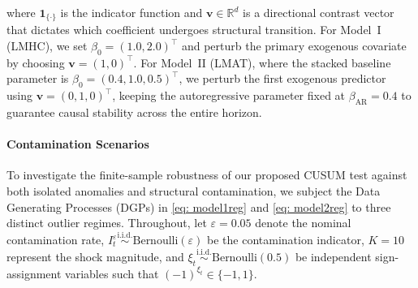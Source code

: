\documentclass[10pt, a4paper]{article}
\theoremstyle{assumption}
\theoremstyle{definition}
\theoremstyle{theorem}
\begin{document}
    where $\mathbf{1}_{\{\cdot\}}$ is the indicator function and $\mathbf{v} \in \mathbb{R}^d$ is a directional contrast vector that dictates which coefficient undergoes structural transition. For Model~I (LMHC), we set $\beta_0 = (1.0, 2.0)^\top$ and perturb the primary exogenous covariate by choosing $\mathbf{v} = (1, 0)^\top$. For Model~II (LMAT), where the stacked baseline parameter is $\beta_0 = (0.4, 1.0, 0.5)^\top$, we perturb the first exogenous predictor using $\mathbf{v} = (0, 1, 0)^\top$, keeping the autoregressive parameter fixed at $\beta_{\text{AR}} = 0.4$ to guarantee causal stability across the entire horizon.



\paragraph{Contamination Scenarios} 
To investigate the finite-sample robustness of our proposed CUSUM test against both isolated anomalies and structural contamination, we subject the Data Generating Processes (DGPs) in \eqref{eq: model1reg} and \eqref{eq: model2reg} to three distinct outlier regimes. Throughout, let $\varepsilon =0.05$ denote the nominal contamination rate, $I_t^\varepsilon \overset{\text{i.i.d.}}{\sim} \text{Bernoulli}(\varepsilon)$ be the contamination indicator, $K = 10$ represent the shock magnitude, and $\xi_t \overset{\text{i.i.d.}}{\sim} \text{Bernoulli}(0.5)$ be independent sign-assignment variables such that $(-1)^{\xi_t} \in \{-1, 1\}$.
  
\end{document}
